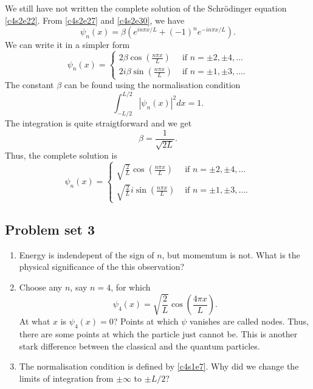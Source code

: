 We still have not written the complete solution of the Schr\"{o}dinger equation
\eqref{c4s2e22}. From \eqref{c4s2e27} and \eqref{c4s2e30}, we have
\begin{equation}\label{c4s2e34}
\psi_n(x) = \beta(e^{in\pi x/L} + (-1)^n e^{-in\pi x/L}).
\end{equation} 
We can write it in a simpler form
\begin{equation}\label{c4s2e35}
\psi_n(x) = \begin{cases}
2\beta\cos\left(\frac{n\pi x}{L}\right) & \text{ if } n = \pm 2, \pm 4, \ldots\\
2i\beta\sin\left(\frac{n\pi x}{L}\right) & \text{ if } n = \pm 1, \pm 3, \ldots.
\end{cases}
\end{equation}
The constant $\beta$ can be found using the normalisation condition
\begin{equation}\label{c4s2e36}
\int_{-L/2}^{L/2} |\psi_n(x)|^2dx = 1.
\end{equation}
The integration is quite straigtforward and we get
\begin{equation}\label{c4s2e37}
\beta = \frac{1}{\sqrt{2L}}.
\end{equation}
Thus, the complete solution is
\begin{equation}\label{c4s2e38}
\psi_n(x) = \begin{cases}
\sqrt{\frac{2}{L}}\cos\left(\frac{n\pi x}{L}\right) & 
   \text{ if } n = \pm 2, \pm 4, \ldots \\
\sqrt{\frac{2}{L}}i\sin\left(\frac{n\pi x}{L}\right) & 
   \text{ if } n = \pm 1, \pm 3, \ldots.
\end{cases}
\end{equation}

\subsection{Problem set 3}
\begin{enumerate}
\item Energy is indendepent of the sign of $n$, but momemtum is not. What is 
the physical significance of the this observation?
\item Choose any $n$, say $n = 4$, for which
\[
\psi_4(x) = \sqrt{\frac{2}{L}}\cos\left(\frac{4\pi x}{L}\right).
\]
At what $x$ is $\psi_4(x) = 0$? Points at which $\psi$ vanishes are called 
nodes.  Thus, there are some points at which the particle just cannot be. This 
is another stark difference between the classical and the quantum particles.
\item The normalisation condition is defined by \eqref{c4s1e7}. Why did we 
change the limits of integration from $\pm\infty$ to $\pm L/2$?
\end{enumerate}


